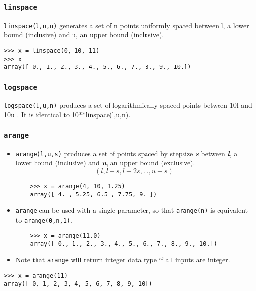 \documentclass[KSmain.tex]{subfiles}
\begin{document}
\subsubsection*{\texttt{linspace}}
\texttt{linspace(l,u,n)} generates a set of n points uniformly spaced between l, a lower bound (inclusive) and u,
an upper bound (inclusive).
\begin{framed}
\begin{verbatim}
>>> x = linspace(0, 10, 11)
>>> x
array([ 0., 1., 2., 3., 4., 5., 6., 7., 8., 9., 10.])
\end{verbatim}
\end{framed}
\subsubsection*{\texttt{logspace}}
\texttt{logspace(l,u,n)} produces a set of logarithmically spaced points between 10l and 10u . It is identical to
10**linspace(l,u,n).
\subsubsection*{\texttt{arange}}
\begin{itemize}
\item \texttt{arange(l,u,s)} produces a set of points spaced by stepsize \textbf{\textit{s}} between \textbf{\textit{l}}, a lower bound (inclusive) and \textbf{\textit{u}}, an upper
bound (exclusive). 
\[  (l , l+s, l+2s , \ldots, u-s)\]
\begin{framed}
	\begin{verbatim}
	>>> x = arange(4, 10, 1.25)
	array([ 4. , 5.25, 6.5 , 7.75, 9. ])
	\end{verbatim}
\end{framed}

\item \texttt{arange} can be used with a single parameter, so that \texttt{arange(n)} is equivalent to
\texttt{arange(0,n,1)}.
\begin{framed}
	\begin{verbatim}
	>>> x = arange(11.0)
	array([ 0., 1., 2., 3., 4., 5., 6., 7., 8., 9., 10.])
	\end{verbatim}
\end{framed}
\item Note that \texttt{arange} will return integer data type if all inputs are integer.
\end{itemize}

\begin{framed}
\begin{verbatim}
>>> x = arange(11)
array([ 0, 1, 2, 3, 4, 5, 6, 7, 8, 9, 10])

\end{verbatim}
\end{framed}
\end{document}
